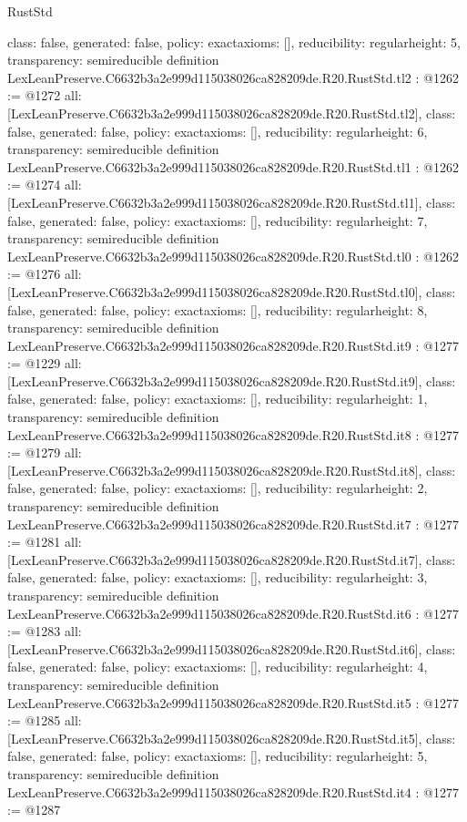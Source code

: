 \begin{lexlean}{RustStd}
\begin{coremodule}
{  class: false,
  generated: false,
  policy: exact{axioms: []},
  reducibility: regular{height: 5},
  transparency: semireducible
}
definition LexLeanPreserve.C6632b3a2e999d115038026ca828209de.R20.RustStd.tl2 : @1262 := @1272 {
  all: [LexLeanPreserve.C6632b3a2e999d115038026ca828209de.R20.RustStd.tl2],
  class: false,
  generated: false,
  policy: exact{axioms: []},
  reducibility: regular{height: 6},
  transparency: semireducible
}
definition LexLeanPreserve.C6632b3a2e999d115038026ca828209de.R20.RustStd.tl1 : @1262 := @1274 {
  all: [LexLeanPreserve.C6632b3a2e999d115038026ca828209de.R20.RustStd.tl1],
  class: false,
  generated: false,
  policy: exact{axioms: []},
  reducibility: regular{height: 7},
  transparency: semireducible
}
definition LexLeanPreserve.C6632b3a2e999d115038026ca828209de.R20.RustStd.tl0 : @1262 := @1276 {
  all: [LexLeanPreserve.C6632b3a2e999d115038026ca828209de.R20.RustStd.tl0],
  class: false,
  generated: false,
  policy: exact{axioms: []},
  reducibility: regular{height: 8},
  transparency: semireducible
}
definition LexLeanPreserve.C6632b3a2e999d115038026ca828209de.R20.RustStd.it9 : @1277 := @1229 {
  all: [LexLeanPreserve.C6632b3a2e999d115038026ca828209de.R20.RustStd.it9],
  class: false,
  generated: false,
  policy: exact{axioms: []},
  reducibility: regular{height: 1},
  transparency: semireducible
}
definition LexLeanPreserve.C6632b3a2e999d115038026ca828209de.R20.RustStd.it8 : @1277 := @1279 {
  all: [LexLeanPreserve.C6632b3a2e999d115038026ca828209de.R20.RustStd.it8],
  class: false,
  generated: false,
  policy: exact{axioms: []},
  reducibility: regular{height: 2},
  transparency: semireducible
}
definition LexLeanPreserve.C6632b3a2e999d115038026ca828209de.R20.RustStd.it7 : @1277 := @1281 {
  all: [LexLeanPreserve.C6632b3a2e999d115038026ca828209de.R20.RustStd.it7],
  class: false,
  generated: false,
  policy: exact{axioms: []},
  reducibility: regular{height: 3},
  transparency: semireducible
}
definition LexLeanPreserve.C6632b3a2e999d115038026ca828209de.R20.RustStd.it6 : @1277 := @1283 {
  all: [LexLeanPreserve.C6632b3a2e999d115038026ca828209de.R20.RustStd.it6],
  class: false,
  generated: false,
  policy: exact{axioms: []},
  reducibility: regular{height: 4},
  transparency: semireducible
}
definition LexLeanPreserve.C6632b3a2e999d115038026ca828209de.R20.RustStd.it5 : @1277 := @1285 {
  all: [LexLeanPreserve.C6632b3a2e999d115038026ca828209de.R20.RustStd.it5],
  class: false,
  generated: false,
  policy: exact{axioms: []},
  reducibility: regular{height: 5},
  transparency: semireducible
}
definition LexLeanPreserve.C6632b3a2e999d115038026ca828209de.R20.RustStd.it4 : @1277 := @1287 {
}
\end{coremodule}
\end{lexlean}

